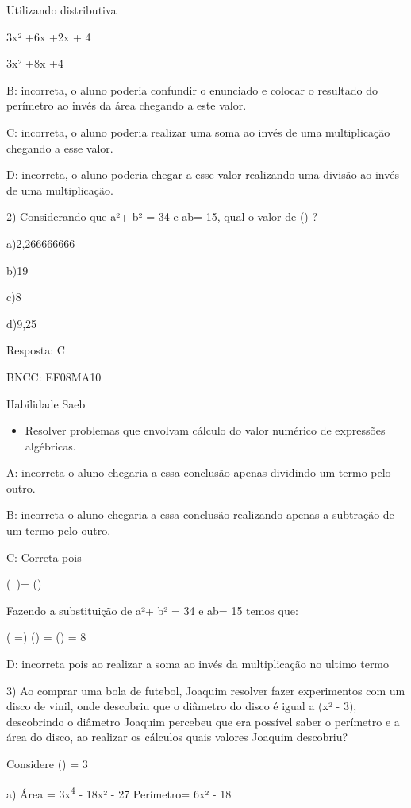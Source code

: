Utilizando distributiva

3x² +6x +2x + 4

3x² +8x +4

B: incorreta, o aluno poderia confundir o enunciado e colocar o
resultado do perímetro ao invés da área chegando a este valor.

C: incorreta, o aluno poderia realizar uma soma ao invés de uma
multiplicação chegando a esse valor.

D: incorreta, o aluno poderia chegar a esse valor realizando uma divisão
ao invés de uma multiplicação.

2) Considerando que a²+ b² = 34 e ab= 15, qual o valor de
() ?

a)2,266666666

b)19

c)8

d)9,25

Resposta: C

BNCC: EF08MA10

Habilidade Saeb

\begin{itemize}
\tightlist
\item
  Resolver problemas que envolvam cálculo do valor numérico de
  expressões algébricas.
\end{itemize}

A: incorreta o aluno chegaria a essa conclusão apenas dividindo um termo
pelo outro.

B: incorreta o aluno chegaria a essa conclusão realizando apenas a
subtração de um termo pelo outro.

C: Correta pois

(\ )= ()

Fazendo a substituição de a²+ b² = 34 e ab= 15 temos que:

( =) () = () = 8

D: incorreta pois ao realizar a soma ao invés da multiplicação no ultimo
termo

3) Ao comprar uma bola de futebol, Joaquim resolver fazer experimentos
com um disco de vinil, onde descobriu que o diâmetro do disco é igual a
(x² - 3), descobrindo o diâmetro Joaquim percebeu que era possível saber
o perímetro e a área do disco, ao realizar os cálculos quais valores
Joaquim descobriu?

Considere (\pi) = 3

a) Área = 3x\textsuperscript{4} - 18x² - 27 Perímetro= 6x² - 18

